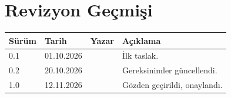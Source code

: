 \section*{Revizyon Geçmişi}

\begin{tabularx}{\textwidth}{@{}l l l X@{}}
  \toprule
  \textbf{Sürüm} & \textbf{Tarih} & \textbf{Yazar} & \textbf{Açıklama}            \\
  \midrule
  0.1            & 01.10.2026     & \docauthor{}   & İlk taslak.                  \\
  0.2            & 20.10.2026     & \docauthor{}   & Gereksinimler güncellendi.   \\
  1.0            & 12.11.2026     & \docauthor{}   & Gözden geçirildi, onaylandı. \\
  \bottomrule
\end{tabularx}
\clearpage

